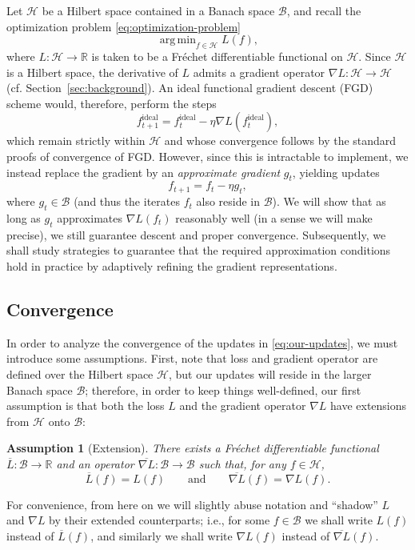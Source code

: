 \documentclass{article}
\newtheorem{assumption}[theorem]{Assumption}
\newcommand{\R}{\mathbb{R}}
\DeclareMathOperator*{\argmin}{arg\,min}
\renewcommand{\H}{\mathcal{H}}
\newcommand{\B}{\mathcal{B}}
\begin{document}
Let $\H$ be a Hilbert space contained in a Banach space $\B$,
and recall the optimization problem \eqref{eq:optimization-problem}
\[ \argmin_{f \in \H} L(f), \]
where $L : \H \to \mathbb{R}$ is taken to be a Fréchet differentiable functional on $\H$.
Since $\H$ is a Hilbert space, the derivative of $L$ admits a gradient operator $\nabla L : \H \to \H$ (cf. Section~\ref{sec:background}).
An ideal functional gradient descent (FGD) scheme would, therefore, perform the steps
\[ f^\mathrm{ideal}_{t+1} = f^\mathrm{ideal}_t - \eta \nabla L(f^\mathrm{ideal}_t), \]
which remain strictly within $\H$ and whose convergence follows by the standard proofs of convergence of FGD.
However, since this is intractable to implement, we instead replace the gradient by an \emph{approximate gradient} $g_t$, yielding updates
\begin{equation}\label{eq:our-updates}
    f_{t+1} = f_t - \eta g_t,
\end{equation}
where $g_t \in \B$ (and thus the iterates $f_t$ also reside in $\B$).
We will show that as long as $g_t$ approximates $\nabla L(f_t)$ reasonably well (in a sense we will make precise), we still guarantee descent and proper convergence.
Subsequently, we shall study strategies to guarantee that the required approximation conditions hold in practice by adaptively refining the gradient representations.

\subsection{Convergence}\label{sec:method-convergence}

In order to analyze the convergence of the updates in \autoref{eq:our-updates}, we must introduce some assumptions.
First, note that loss and gradient operator are defined over the Hilbert space $\H$, but our updates will reside in the larger Banach space $\B$;
therefore, in order to keep things well-defined, our first assumption is that both the loss $L$ and the gradient operator $\nabla L$ have extensions from $\H$ onto $\B$:
\begin{assumption}[Extension]\label{assumpt:continuous-extension}
    There exists a Fréchet differentiable functional $\overline{L} : \B \to \R$ and an operator $\overline{\nabla L} : \B \to \B$ such that, for any $f \in \H$,
    \[ \overline{L}(f) = L(f) \qquad\text{and}\qquad \overline{\nabla L}(f) = \nabla L(f). \]
\end{assumption}
For convenience, from here on we will slightly abuse notation and ``shadow'' $L$ and $\nabla L$ by their extended counterparts; i.e., for some $f \in \B$ we shall write $L(f)$ instead of $\overline{L}(f)$, and similarly we shall write $\nabla L(f)$ instead of $\overline{\nabla L}(f)$.
\end{document}
